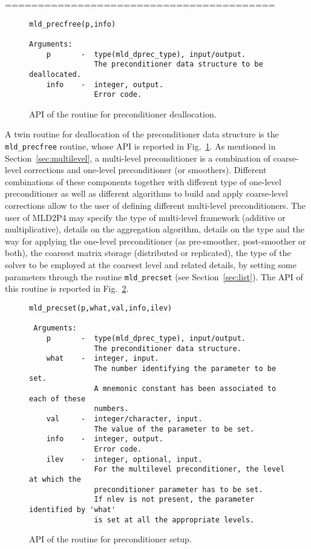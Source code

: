 \clearpage
\noindent
=========================================\\

\begin{figure}[h]
\begin{center}
{\small
\begin{verbatim}
mld_precfree(p,info)

Arguments:
    p       -  type(mld_dprec_type), input/output.
               The preconditioner data structure to be deallocated.
    info    -  integer, output.
               Error code.
\end{verbatim}
}
\end{center}
\caption{API of the routine for preconditioner deallocation.\label{fig:prcfree}}
\end{figure}

A twin routine for deallocation of the preconditioner data structure is the \verb|mld_precfree| routine, whose API is reported in
Fig.~\ref{fig:prcfree}.
As mentioned in Section~\ref{sec:multilevel}, a multi-level preconditioner is a combination
of coarse-level corrections and one-level preconditioner (or smoothers).
Different combinations of these components together with different type of one-level preconditioner
as well as different algorithms to build and apply coarse-level corrections allow to the user of defining different multi-level
preconditioners.
The user of MLD2P4 may specify the type of multi-level framework (additive or multiplicative), details on the
aggregation algorithm, details on the type and the way for applying the one-level preconditioner
(as pre-smoother, post-smoother or both), the coarsest matrix storage
(distributed or replicated), the type of the solver to be employed at the coarsest level
and related details, by setting some parameters through the routine \verb|mld_precset| (see Section~\ref{sec:list}).
The API of this routine is reported in Fig.~\ref{fig:prcset}.
%
\begin{figure}[h]
\begin{center}
{\small
\begin{verbatim}
mld_precset(p,what,val,info,ilev)

 Arguments:
    p       -  type(mld_dprec_type), input/output.
               The preconditioner data structure.
    what    -  integer, input.
               The number identifying the parameter to be set.
               A mnemonic constant has been associated to each of these
               numbers.
    val     -  integer/character, input.
               The value of the parameter to be set. 
    info    -  integer, output.
               Error code.
    ilev    -  integer, optional, input.
               For the multilevel preconditioner, the level at which the
               preconditioner parameter has to be set. 
               If nlev is not present, the parameter identified by 'what'
               is set at all the appropriate levels.
\end{verbatim}
}
\end{center}
\caption{API of the routine for preconditioner setup.\label{fig:prcset}}
\end{figure}
